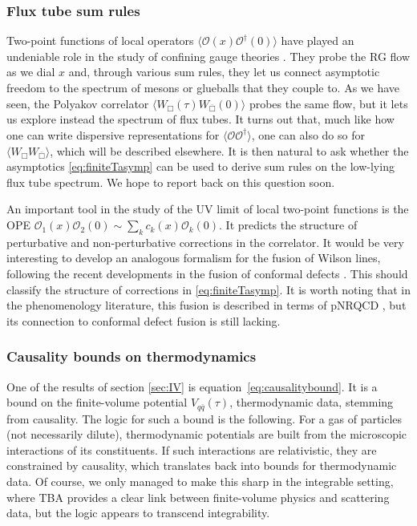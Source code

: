 \documentclass[
 reprint,
 amsmath,
 pre,
 amssymb,
 nofootinbib,
 aps,
 longbibliography,
]{revtex4-1}
\newcommand{\<}{{\langle}}
\renewcommand{\>}{{\rangle}}
\begin{document}
\subsubsection*{Flux tube sum rules}
\vspace{-5pt}
Two-point functions of local operators $\langle \mathcal O(x) \mathcal O^\dagger(0)\rangle$ have played an undeniable role in the study of confining gauge theories \cite{Weinberg:1967kj,Shifman:1978bx,Shifman:1978by}. They probe the RG flow as we dial $x$ and, through various sum rules, they let us connect asymptotic freedom to the spectrum of mesons or glueballs that they couple to. As we have seen, the Polyakov correlator $\langle W_{\Box}(\tau) W_{\overline{\Box}}(0)\rangle$ probes the same flow, but it lets us explore instead the spectrum of flux tubes.
It turns out that, much like how one can write dispersive representations for $\langle \mathcal O \mathcal O^\dagger\rangle$, one can also do so for $\langle W_{\Box}W_{\overline{\Box}}\rangle$, which will be described elsewhere. It is then natural to ask whether the asymptotics \eqref{eq:finiteTasymp} can be used to derive sum rules on the low-lying flux tube spectrum. We hope to report back on this question soon.

An important tool in the study of the UV limit of local two-point functions is the OPE $\mathcal O_1(x) \mathcal O_2(0) \sim \sum_k c_k(x) \mathcal O_k(0)$. It predicts the structure of perturbative and non-perturbative corrections in the correlator. It would be very interesting to develop an analogous formalism for the fusion of Wilson lines, following the recent developments in the fusion of conformal defects \cite{Diatlyk:2024zkk,Diatlyk:2024qpr,Kravchuk:2024qoh,Cuomo:2024psk}. This should classify the structure of corrections in \eqref{eq:finiteTasymp}.
It is worth noting that in the phenomenology literature, this fusion is described in terms of pNRQCD \cite{Brambilla:1999xf,Brambilla:2004jw}, but its connection to conformal defect fusion is still lacking.

\vspace{-15pt}
\subsubsection*{Causality bounds on thermodynamics}
\vspace{-5pt}
One of the results of section \ref{sec:IV} is equation~\eqref{eq:causalitybound}. It is a bound on the finite-volume potential $V_{q\bar q}(\tau)$, thermodynamic data, stemming from causality. The logic for such a bound is the following. For a gas of particles (not necessarily dilute), thermodynamic potentials are built from the microscopic interactions of its constituents. If such interactions are relativistic, they are constrained by causality, which translates back into bounds for thermodynamic data. Of course, we only managed to make this sharp in the integrable setting, where TBA provides a clear link between finite-volume physics and scattering data, but the logic appears to transcend integrability.
\end{document}
